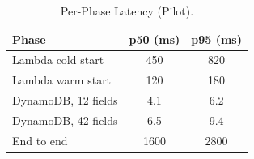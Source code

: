 \begin{table}[htbp]
\caption{Per-Phase Latency (Pilot).}
\label{tab:latency}
\centering
\begin{tabular}{lcc}
\toprule
\textbf{Phase} & \textbf{p50 (ms)} & \textbf{p95 (ms)} \\
\midrule
Lambda cold start       & 450 & 820 \\
Lambda warm start       & 120 & 180 \\
DynamoDB, 12 fields     & 4.1 & 6.2 \\
DynamoDB, 42 fields     & 6.5 & 9.4 \\
End to end              & 1600 & 2800 \\
\bottomrule
\end{tabular}
\end{table}
